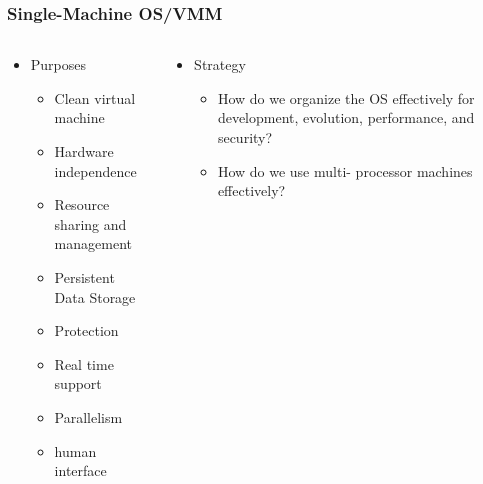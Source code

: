 \begin{frame}[t]
	\frametitle{Single-Machine OS/VMM}
	\begin{columns}[t]
		\begin{column}{.5\textwidth}
			
			\begin{itemize}\Large
				\item Purposes
				\begin{itemize}\large
					\item Clean virtual machine
					\item Hardware independence
					\item Resource sharing and management
					\item Persistent Data Storage
					\item Protection
					\item Real time support
					\item Parallelism
					\item human interface
					
				\end{itemize}
			\end{itemize}
			
		\end{column}
		
		\begin{column}{.5\textwidth}
			
			\begin{itemize}\Large
				\item Strategy
				\begin{itemize}\large
					\item How do we organize the OS
					effectively for development,
					evolution, performance,
					and security?
					\item How do we use multi-
					processor machines
					effectively?
					
				\end{itemize}
			\end{itemize}
			
		\end{column}
	\end{columns}
\end{frame}


